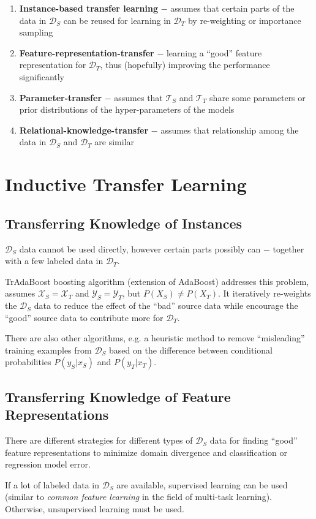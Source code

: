 \documentclass[a4paper,twocolumn]{article}
\newcommand{\D}{\mathcal{D}}
\newcommand{\T}{\mathcal{T}}
\newcommand{\X}{\mathcal{X}}
\newcommand{\Y}{\mathcal{Y}}
\begin{document}
\begin{enumerate}
    \item \textbf{Instance-based transfer learning} $-$ assumes that certain parts of the data in $\D_S$ can be reused for learning in $\D_T$ by re-weighting or importance sampling
    \item \textbf{Feature-representation-transfer} $-$ learning a ``good'' feature representation for $\D_T$, thus (hopefully) improving the performance significantly
    \item \textbf{Parameter-transfer} $-$ assumes that $\T_S$ and $\T_T$ share some parameters or prior distributions of the hyper-parameters of the models
    \item \textbf{Relational-knowledge-transfer} $-$ assumes that relationship among the data in $\D_S$ and $\D_T$ are similar
\end{enumerate}

\section{Inductive Transfer Learning}
\subsection{Transferring Knowledge of Instances}
$\D_S$ data cannot be used directly, however certain parts possibly can $-$ together with a few labeled data in $\D_T$.

TrAdaBoost boosting algorithm (extension of AdaBoost) addresses this problem, assumes $\X_S = \X_T$ and $\Y_S = \Y_T$, but $P(X_S) \ne P(X_T)$. It iteratively re-weights the $\D_S$ data to reduce the effect of the ``bad'' source data while encourage the ``good'' source data to contribute more for $\D_T$.

There are also other algorithms, e.g. a heuristic method to remove ``misleading'' training examples from $\D_S$ based on the difference between conditional probabilities $P(y_S|x_S)$ and $P(y_T|x_T)$.

\subsection{Transferring Knowledge of Feature Representations}
There are different strategies for different types of $\D_S$ data for finding ``good'' feature representations to minimize domain divergence and classification or regression model error.

If a lot of labeled data in $\D_S$ are available, supervised learning can be used (similar to \textit{common feature learning} in the field of multi-task learning).
Otherwise, unsupervised learning must be used.
\end{document}

